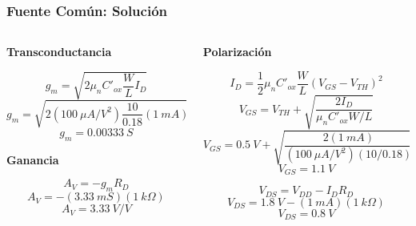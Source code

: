 \begin{frame}[t]
    \frametitle{Fuente Común: Solución}

    \begin{columns}
        \begin{column}{0.5\textwidth}
            \textbf{Transconductancia}

            \[ g_m = \sqrt{2 \mu_n C'_{ox} \dfrac{W}{L} I_D } \]
            \[ g_m = \sqrt{2 (100\ \mu A/V^2) \dfrac{10}{0.18} (1\ mA) } \]
            \[ \boxed{g_m = 0.00333\ S} \]

            \textbf{Ganancia}

            \[ A_V = -g_m R_D \]
            \[ A_V = -(3.33\ mS)(1\ k\Omega) \]
            \[ \boxed{A_V = 3.33\ V/V} \]
        \end{column}
        \begin{column}{0.5\textwidth}
            \textbf{Polarización}

            \[ I_D = \dfrac{1}{2} \mu_n C'_{ox} \dfrac{W}{L} (V_{GS}-V_{TH})^2 \]
            \[ V_{GS} = V_{TH} + \sqrt{\dfrac{2 I_D}{\mu_n C'_{ox} W/L}} \]
            \[ V_{GS} = 0.5\ V + \sqrt{\dfrac{2 (1\ mA)}{(100\ \mu A/V^2) (10/0.18)}} \]
            \[ \boxed{V_{GS} = 1.1\ V} \]

            \[ V_{DS} = V_{DD} - I_D R_D \]
            \[ V_{DS} = 1.8\ V - (1\ mA)(1\ k\Omega) \]
            \[ \boxed{V_{DS} = 0.8\ V} \]
            
        \end{column}
    \end{columns}
\end{frame}

